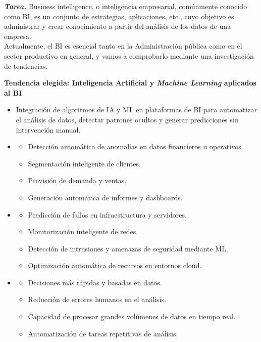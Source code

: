 {
	\textbf{\textit{Tarea.}}
	Business intelligence, o inteligencia empresarial, comúnmente conocido como BI, es un conjunto de estrategias,
	aplicaciones, etc., cuyo objetivo es administrar y crear conocimiento a partir del análisis de los datos de una
	empresa.
}\\

Actualmente, el BI es esencial tanto en la Administración pública como en el sector productivo en general,
y vamos a comprobarlo mediante una investigación de tendencias.


\begin{solution}
	\textbf{Tendencia elegida: Inteligencia Artificial y \textit{Machine Learning} aplicados al BI}

	\begin{itemize}
		\item {} Integración de algoritmos de IA y ML en plataformas de BI para
		      automatizar el análisis de datos, detectar patrones ocultos y generar predicciones sin
		      intervención manual.

		\item {}
		      \begin{itemize}
			      \item Detección automática de anomalías en datos financieros u operativos.
			      \item Segmentación inteligente de clientes.
			      \item Previsión de demanda y ventas.
			      \item Generación automática de informes y dashboards.
		      \end{itemize}

		\item {}
		      \begin{itemize}
			      \item Predicción de fallos en infraestructura y servidores.
			      \item Monitorización inteligente de redes.
			      \item Detección de intrusiones y amenazas de seguridad mediante ML.
			      \item Optimización automática de recursos en entornos cloud.
		      \end{itemize}

		\item {}
		      \begin{itemize}
			      \item Decisiones más rápidas y basadas en datos.
			      \item Reducción de errores humanos en el análisis.
			      \item Capacidad de procesar grandes volúmenes de datos en tiempo real.
			      \item Automatización de tareas repetitivas de análisis.
		      \end{itemize}


\end{itemize}
\end{solution}
